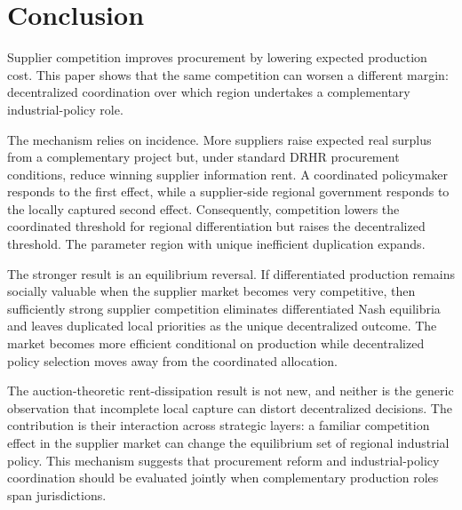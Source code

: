 \section{Conclusion}
\label{sec:conclusion}

Supplier competition improves procurement by lowering expected production cost. This paper shows that the same competition can worsen a different margin: decentralized coordination over which region undertakes a complementary industrial-policy role.

The mechanism relies on incidence. More suppliers raise expected real surplus from a complementary project but, under standard DRHR procurement conditions, reduce winning supplier information rent. A coordinated policymaker responds to the first effect, while a supplier-side regional government responds to the locally captured second effect. Consequently, competition lowers the coordinated threshold for regional differentiation but raises the decentralized threshold. The parameter region with unique inefficient duplication expands.

The stronger result is an equilibrium reversal. If differentiated production remains socially valuable when the supplier market becomes very competitive, then sufficiently strong supplier competition eliminates differentiated Nash equilibria and leaves duplicated local priorities as the unique decentralized outcome. The market becomes more efficient conditional on production while decentralized policy selection moves away from the coordinated allocation.

The auction-theoretic rent-dissipation result is not new, and neither is the generic observation that incomplete local capture can distort decentralized decisions. The contribution is their interaction across strategic layers: a familiar competition effect in the supplier market can change the equilibrium set of regional industrial policy. This mechanism suggests that procurement reform and industrial-policy coordination should be evaluated jointly when complementary production roles span jurisdictions.
